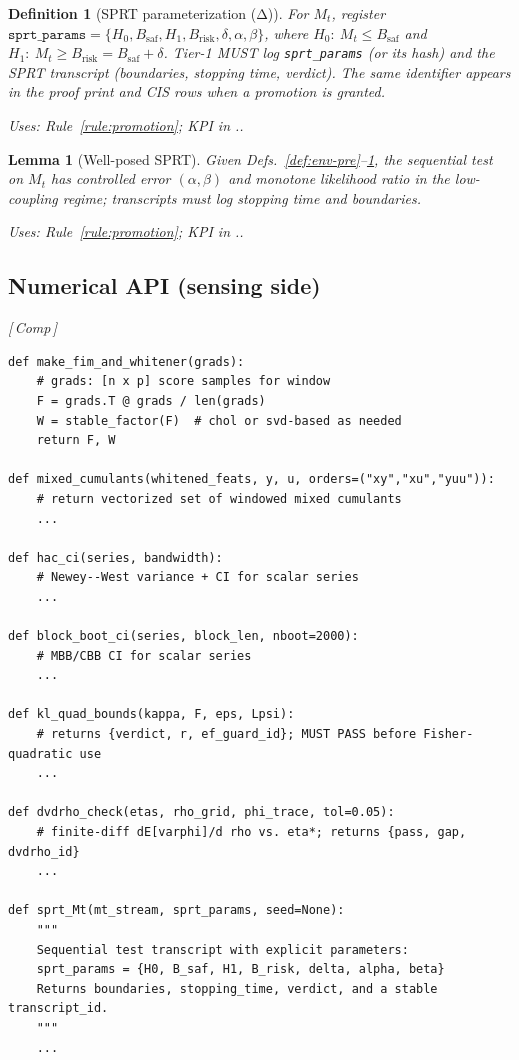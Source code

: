 \documentclass[10pt]{article}
\makeatletter
\newcommand{\uses}[1]{\par\smallskip\noindent\textit{Uses: }#1.\par\smallskip}
\newcommand{\layertag}[1]{\textsf{\footnotesize[\,#1\,]}}
\newcommand{\JSGxref}[2]{%
  \@ifundefined{r@#2}{\textbf{[#1 ??]}}{#1~\ref{#2}}}
\newcommand{\secref}[1]{\JSGxref{§}{#1}}
\newtheorem{lemma}{Lemma}
\newtheorem{definition}{Definition}
\makeatother
\begin{document}
\begin{definition}[SPRT parameterization (Δ)]\label{def:sprt-params}
For $M_t$, register $\texttt{sprt\_params}=\{H_0,B_{\mathrm{saf}},H_1,B_{\mathrm{risk}},\delta,\alpha,\beta\}$, where $H_0:\ M_t\le B_{\mathrm{saf}}$ and $H_1:\ M_t\ge B_{\mathrm{risk}}=B_{\mathrm{saf}}+\delta$. Tier-1 MUST log \texttt{sprt\_params} (or its hash) and the SPRT transcript (boundaries, stopping time, verdict). The same identifier appears in the proof print and CIS rows when a promotion is granted.
\uses{Rule~\ref{rule:promotion}; KPI in \secref{subsec:ops-kpis}.}
\end{definition}

\begin{lemma}[Well-posed SPRT]\label{lem:sprt-wellposed}
Given Defs.~\ref{def:env-pre}–\ref{def:sprt-params}, the sequential test on $M_t$ has controlled error $(\alpha,\beta)$ and monotone likelihood ratio in the low-coupling regime; transcripts must log stopping time and boundaries.
\uses{Rule~\ref{rule:promotion}; KPI in \secref{subsec:ops-kpis}.}
\end{lemma}

\subsection{Numerical API (sensing side)}\label{subsec:api-sense}
\emph{\layertag{Comp}}
\begin{lstlisting}
def make_fim_and_whitener(grads):
    # grads: [n x p] score samples for window
    F = grads.T @ grads / len(grads)
    W = stable_factor(F)  # chol or svd-based as needed
    return F, W

def mixed_cumulants(whitened_feats, y, u, orders=("xy","xu","yuu")):
    # return vectorized set of windowed mixed cumulants
    ...

def hac_ci(series, bandwidth):
    # Newey--West variance + CI for scalar series
    ...

def block_boot_ci(series, block_len, nboot=2000):
    # MBB/CBB CI for scalar series
    ...

def kl_quad_bounds(kappa, F, eps, Lpsi):
    # returns {verdict, r, ef_guard_id}; MUST PASS before Fisher-quadratic use
    ...

def dvdrho_check(etas, rho_grid, phi_trace, tol=0.05):
    # finite-diff dE[varphi]/d rho vs. eta*; returns {pass, gap, dvdrho_id}
    ...

def sprt_Mt(mt_stream, sprt_params, seed=None):
    """
    Sequential test transcript with explicit parameters:
    sprt_params = {H0, B_saf, H1, B_risk, delta, alpha, beta}
    Returns boundaries, stopping_time, verdict, and a stable transcript_id.
    """
    ...
\end{lstlisting}
\end{document}
